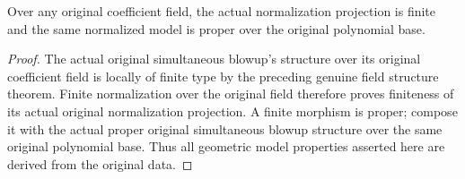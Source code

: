 \begin{theorem}
\label{thm:actual-original-normalized-simultaneous-model-proper}
\leanok
{}
Over any original coefficient field, the actual normalization
projection is finite and the same normalized model is proper over the
original polynomial base.
\end{theorem}
\begin{proof}
The actual original simultaneous blowup's structure over its original
coefficient field is locally of finite type by the preceding genuine field
structure theorem. Finite normalization over the original field therefore proves
finiteness of its actual original normalization projection. A finite
morphism is proper; compose it with the actual proper original simultaneous
blowup structure over the same original polynomial base. Thus all geometric
model properties asserted here are derived from the original data.
\end{proof}
